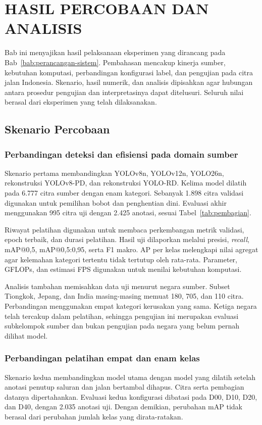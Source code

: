\chapter{HASIL PERCOBAAN DAN ANALISIS}
\label{bab:hasil-percobaan-dan-analisis}

Bab ini menyajikan hasil pelaksanaan eksperimen yang dirancang pada Bab~\ref{bab:perancangan-sistem}. Pembahasan mencakup kinerja sumber, kebutuhan komputasi, perbandingan konfigurasi label, dan pengujian pada citra jalan Indonesia. Skenario, hasil numerik, dan analisis dipisahkan agar hubungan antara prosedur pengujian dan interpretasinya dapat ditelusuri. Seluruh nilai berasal dari eksperimen yang telah dilaksanakan.

\section{Skenario Percobaan}
\subsection{Perbandingan deteksi dan efisiensi pada domain sumber}
Skenario pertama membandingkan YOLOv8n, YOLOv12n, YOLO26n, rekonstruksi YOLOv8-PD, dan rekonstruksi YOLO-RD. Kelima model dilatih pada 6.777 citra sumber dengan enam kategori. Sebanyak 1.898 citra validasi digunakan untuk pemilihan bobot dan penghentian dini. Evaluasi akhir menggunakan 995 citra uji dengan 2.425 anotasi, sesuai Tabel~\ref{tab:pembagian}.

Riwayat pelatihan digunakan untuk membaca perkembangan metrik validasi, epoch terbaik, dan durasi pelatihan. Hasil uji dilaporkan melalui presisi, \textit{recall}, mAP@0,5, mAP@0,5:0,95, serta F1 makro. AP per kelas melengkapi nilai agregat agar kelemahan kategori tertentu tidak tertutup oleh rata-rata. Parameter, GFLOPs, dan estimasi FPS digunakan untuk menilai kebutuhan komputasi.

Analisis tambahan memisahkan data uji menurut negara sumber. Subset Tiongkok, Jepang, dan India masing-masing memuat 180, 705, dan 110 citra. Perbandingan menggunakan empat kategori kerusakan yang sama. Ketiga negara telah tercakup dalam pelatihan, sehingga pengujian ini merupakan evaluasi subkelompok sumber dan bukan pengujian pada negara yang belum pernah dilihat model.

\subsection{Perbandingan pelatihan empat dan enam kelas}
Skenario kedua membandingkan model utama dengan model yang dilatih setelah anotasi penutup saluran dan jalan bertambal dihapus. Citra serta pembagian datanya dipertahankan. Evaluasi kedua konfigurasi dibatasi pada D00, D10, D20, dan D40, dengan 2.035 anotasi uji. Dengan demikian, perubahan mAP tidak berasal dari perubahan jumlah kelas yang dirata-ratakan.


